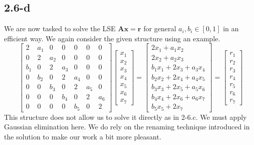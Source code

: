 \documentclass{article}
\begin{document}
\subsection*{2.6-d}
We are now tasked to solve the LSE $\mathbf{A}\mathbf{x} = \mathbf{r}$ for general $a_{i}, b_{i} \in \left[0,1\right]$ in an efficient way. We again consider the given structure using an example.
\begin{equation*}
    \begin{bmatrix}
    2 & a_{1} & 0 & 0 & 0 & 0& 0 \\
    0 & 2 & a_{2} & 0 & 0& 0 & 0 \\
    b_{1} & 0 & 2 & a_{3} & 0 & 0& 0 \\
    0 & b_{2} & 0& 2& a_{4} & 0& 0\\
    0 & 0 &b_{3} & 0 & 2 & a_{5} & 0\\
    0 & 0 & 0 & b_{4} & 0 & 2 & a_{6} \\
    0  & 0 & 0 & 0 & b_{5} & 0 & 2
    \end{bmatrix}
    \begin{bmatrix}
        x_{1} \\ x_{2} \\ x_{3} \\ x_{4} \\ x_{5} \\ x_{6} \\ x_{7}
    \end{bmatrix} =
    \begin{bmatrix}
        2x_{1} + a_{1}x_{2} \\
        2x_{2} + a_{2}x_{3} \\
        b_{1}x_{1} + 2x_{3} + a_{3}x_{4} \\
        b_{2}x_{2} + 2x_{4} + a_{4}x_{5} \\
        b_{3}x_{3} + 2x_{5} + a_{5}x_{6} \\
        b_{4}x_{4} + 2x_{6} + a_{6}x_{7} \\
        b_{5}x_{5} + 2x_{7}
    \end{bmatrix} = \begin{bmatrix}
        r_{1} \\ r_{2}  \\ r_{3} \\ r_{4} \\ r_{5} \\ r_{6} \\ r_{7}
    \end{bmatrix}
\end{equation*}
This structure does not allow us to solve it directly as in 2-6.c. We must apply Gaussian elimination here. We do rely on the renaming technique introduced in the solution to make our work a bit more pleasant.
\end{document}
